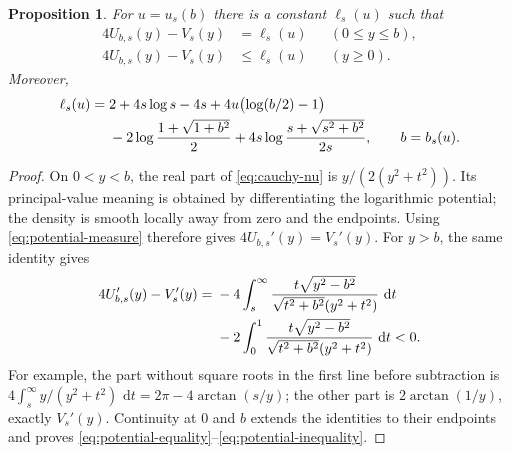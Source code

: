 \documentclass[11pt,letterpaper]{article}
\newtheorem{proposition}[proposition]{Proposition}
\theoremstyle{definition}
\newcommand{\dd}{\,\mathrm d}
\begin{document}
\begin{proposition}\label{prop:potential-inequality}
For $u=u_s(b)$ there is a constant $\ell_s(u)$ such that
\begin{align}
 4U_{b,s}(y)-V_s(y)&=\ell_s(u) &&(0\le y\le b),\label{eq:potential-equality}\\
 4U_{b,s}(y)-V_s(y)&\le\ell_s(u) &&(y\ge0).\label{eq:potential-inequality}
\end{align}
Moreover,
\begin{align}
 \ell_s(u)={}&2+4s\log s-4s
  +4u\bigl(\log(b/2)-1\bigr)\notag\\
 &-2\log\frac{1+\sqrt{1+b^2}}2
  +4s\log\frac{s+\sqrt{s^2+b^2}}{2s},
 \qquad b=b_s(u).\label{eq:ell-explicit}
\end{align}
\end{proposition}
\begin{proof}
On $0<y<b$, the real part of \eqref{eq:cauchy-nu} is
$y/(2(y^2+t^2))$. Its principal-value meaning is obtained by differentiating
the logarithmic potential; the density is smooth locally away from zero
and the endpoints. Using \eqref{eq:potential-measure} therefore gives
$4U_{b,s}'(y)=V_s'(y)$. For $y>b$, the same identity gives
\begin{align}
 4U_{b,s}'(y)-V_s'(y)
 ={}&-4\int_s^\infty
 \frac{t\sqrt{y^2-b^2}}{\sqrt{t^2+b^2}(y^2+t^2)}\,\dd t\notag\\
 &-2\int_0^1
 \frac{t\sqrt{y^2-b^2}}{\sqrt{t^2+b^2}(y^2+t^2)}\,\dd t<0.
 \label{eq:tail-derivative}
\end{align}
For example, the part without square roots in the first line before
subtraction is $4\int_s^\infty y/(y^2+t^2)\,\dd t
=2\pi-4\arctan(s/y)$; the other part is $2\arctan(1/y)$,
exactly $V_s'(y)$. Continuity at $0$ and $b$ extends the identities to
their endpoints and proves \eqref{eq:potential-equality}--\eqref{eq:potential-inequality}.


\end{proof}
\end{document}
